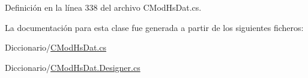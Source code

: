 Definición en la línea 338 del archivo C\-Mod\-Hs\-Dat.\-cs.



La documentación para esta clase fue generada a partir de los siguientes ficheros\-:\begin{DoxyCompactItemize}
\item 
Diccionario/\hyperlink{_c_mod_hs_dat_8cs}{C\-Mod\-Hs\-Dat.\-cs}\item 
Diccionario/\hyperlink{_c_mod_hs_dat_8_designer_8cs}{C\-Mod\-Hs\-Dat.\-Designer.\-cs}\end{DoxyCompactItemize}
